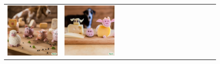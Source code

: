 \begin{figure}[ht!]
\begin{adjustwidth}{-0.8in}{-0.5in}
\begin{tabular}{cccccccccccccccccccc}
\multicolumn{3}{c}{\includegraphics[width=\twobytwocolwidth\textwidth]{figures/cherries/cheese_dog_2.jpg}} &
\multicolumn{3}{c}{\includegraphics[width=\twobytwocolwidth\textwidth]{figures/cherries/cheese_dog_3.jpg}} &&

\end{tabular}
\end{adjustwidth}
\end{figure}
